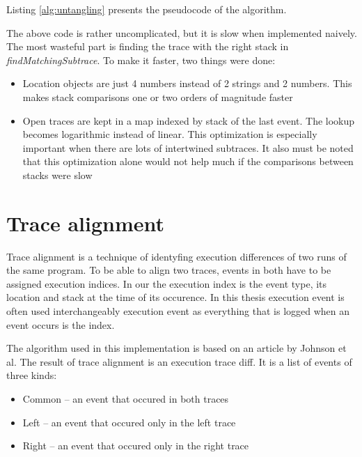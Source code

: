 Listing \ref{alg:untangling} presents the pseudocode of the algorithm.



The above code is rather uncomplicated, but it is slow when implemented naively.
The most wasteful part is finding the trace with the right stack in \emph{findMatchingSubtrace}.
To make it faster, two things were done:
\begin{itemize}
  \item Location objects are just 4 numbers instead of 2 strings and 2 numbers. This makes stack comparisons
           one or two orders of magnitude faster
  \item Open traces are kept in a map indexed by stack of the last event. 
  			The lookup becomes logarithmic instead of linear. This optimization is especially important when there are lots
  			of intertwined subtraces. It also must be noted that this optimization alone would not help much if the comparisons 
  			between stacks were slow
\end{itemize} 


\section{Trace alignment}
\label{trace-alignment}

Trace alignment is a technique of identyfing execution differences of two runs of the same program.
To be able to align two traces, events in both have to be assigned execution indices.
In our the execution index is the event type, its location and stack at the time of its occurence.
In this thesis execution event is often used interchangeably execution event as everything that is
logged when an event occurs is the index.

The algorithm used in this implementation is based on an article by Johnson et al. \cite{ieee:alignment-and-slicing}
The result of trace alignment is an execution trace diff. It is a list of events of three kinds:
\begin{itemize}
  \item Common -- an event that occured in both traces
  \item Left -- an event that occured only in the left trace
  \item Right -- an event that occured only in the right trace
\end{itemize}

